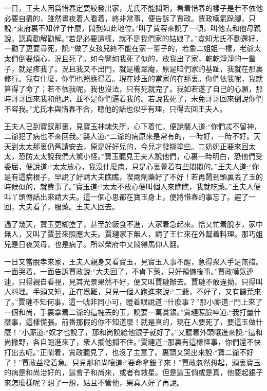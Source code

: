 \begin{parag}
    一日，王夫人因爲惜春定要絞發出家，尤氏不能攔阻，看着惜春的樣子是若不依他必要自盡的，雖然晝夜着人看着，終非常事，便告訴了賈政。賈政嘆氣跺腳，只說:“東府裏不知幹了什麼，鬧到如此地位。”叫了賈蓉來說了一頓，叫他去和他母親說，認真勸解勸解。”若是必要這樣，就不是我們家的姑娘了。”豈知尤氏不勸還好，一勸了更要尋死，說:“做了女孩兒終不能在家一輩子的，若象二姐姐一樣，老爺太太們倒要煩心，況且死了。如今譬如我死了似的，放我出了家，乾乾淨淨的一輩子，就是疼我了。況且我又不出門，就是櫳翠庵，原是咱們家的基趾，我就在那裏修行。我有什麼，你們也照應得着。現在妙玉的當家的在那裏。你們依我呢，我就算得了命了；若不依我呢，我也沒法，只有死就完了。我如若遂了自己的心願，那時哥哥回來我和他說，並不是你們逼着我的。若說我死了，未免哥哥回來倒說你們不容我。”尤氏本與惜春不合，聽他的話也似乎有理，只得去回王夫人。
\end{parag}


\begin{parag}
    王夫人已到寶釵那裏，見寶玉神魂失所，心下着忙，便說襲人道:“你們忒不留神，二爺犯了病也不來回我。”襲人道:“二爺的病原來是常有的，一時好，一時不好。天天到太太那裏仍舊請安去，原是好好兒的，今兒才發糊塗些。二奶奶正要來回太太，恐防太太說我們大驚小怪。”寶玉聽見王夫人說他們，心裏一時明白，恐他們受委屈，便說道:“太太放心，我沒什麼病，只是心裏覺着有些悶悶的。”王夫人道:“你是有這病根子，早說了好請大夫瞧瞧，喫兩劑藥好了不好！若再鬧到頭裏丟了玉的時候似的，就費事了。”寶玉道:“太太不放心便叫個人來瞧瞧，我就吃藥。”王夫人便叫丫頭傳話出來請大夫。這一個心思都在寶玉身上，便將惜春的事忘了。遲了一回，大夫看了，服藥。王夫人回去。
\end{parag}


\begin{parag}
    過了幾天，寶玉更糊塗了，甚至於飯食不進，大家着急起來。恰又忙着脫孝，家中無人，又叫了賈芸來照應大夫。賈璉家下無人，請了王仁來在外幫着料理。那巧姐兒是日夜哭母，也是病了。所以榮府中又鬧得馬仰人翻。
\end{parag}


\begin{parag}
    一日又當脫孝來家，王夫人親身又看寶玉，見寶玉人事不醒，急得衆人手足無措。一面哭着，一面告訴賈政說:“大夫回了，不肯下藥，只好預備後事。”賈政嘆氣連連，只得親自看視，見其光景果然不好，便又叫賈璉辦去。賈璉不敢違拗，只得叫人料理。手頭又短，正在爲難，只見一個人跑進來說:“二爺，不好了，又有饑荒來了。”賈璉不知何事，這一唬非同小可，瞪着眼說道:“什麼事？”那小廝道:“門上來了一個和尚，手裏拿着二爺的這塊丟的玉，說要一萬賞銀。”賈璉照臉啐道:“我打量什麼事，這樣慌張。前番那假的你不知道麼！就是真的，現在人要死了，要這玉做什麼！”小廝道:“奴才也說了，那和尚說給他銀子就好了。”又聽着外頭嚷進來說:“這和尚撒野，各自跑進來了，衆人攔他攔不住。”賈璉道:“那裏有這樣怪事，你們還不快打出去呢。”正鬧着，賈政聽見了，也沒了主意了。裏頭又哭出來說:“寶二爺不好了！”賈政益發着急。只見那和尚嚷道:“要命拿銀子來！”賈政忽然想起，頭裏寶玉的病是和尚治好的，這會子和尚來，或者有救星。但是這玉倘或是真，他要起銀子來怎麼樣呢？想了一想，姑且不管他，果真人好了再說。
\end{parag}


